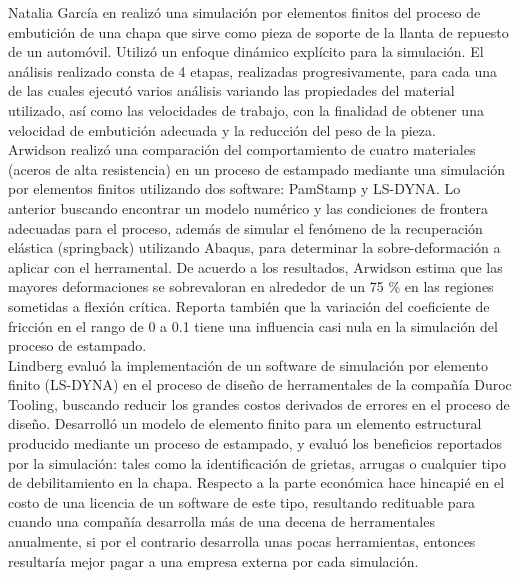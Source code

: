 Natalia García en \cite{garcia2009} realizó una simulación por elementos finitos del proceso de 
embutición de una chapa que sirve como pieza de soporte de la llanta de repuesto de un automóvil. 
Utilizó un enfoque dinámico explícito para la simulación. El análisis realizado consta 
de 4 etapas, realizadas progresivamente, para cada una de las cuales ejecutó varios análisis 
variando las propiedades del material utilizado, así como las velocidades de trabajo, con la 
finalidad de obtener una velocidad de embutición adecuada y la reducción del peso de la pieza.\\

Arwidson \cite{arwidson2005} realizó una comparación del comportamiento de cuatro materiales (aceros de
alta resistencia) en un proceso de estampado mediante una simulación por elementos finitos
utilizando dos software: PamStamp y LS-DYNA. Lo anterior buscando encontrar un modelo 
numérico y las condiciones de frontera adecuadas para el proceso, además de simular
el fenómeno de la recuperación elástica (springback) utilizando Abaqus, para determinar la
sobre-deformación a aplicar con el herramental. De acuerdo a los resultados, Arwidson estima
que las mayores deformaciones se sobrevaloran en alrededor de un 75 \% en las regiones sometidas 
a flexión crítica. Reporta también que la variación del coeficiente de fricción en el rango 
de 0 a 0.1 tiene una influencia casi nula en la simulación del proceso de estampado. \\


Lindberg \cite{lindberg2012} evaluó la implementación de un software de simulación por elemento finito 
(LS-DYNA) en el proceso de diseño de herramentales de la compañía Duroc Tooling, buscando
reducir los grandes costos derivados de errores en el proceso de diseño. Desarrolló un modelo
de elemento finito para un elemento estructural producido mediante un proceso de estampado, 
y evaluó los beneficios reportados por la simulación: tales como la identificación de grietas,
arrugas o cualquier tipo de debilitamiento en la chapa. Respecto a la parte económica hace
hincapié en el costo de una licencia de un software de este tipo, resultando redituable para 
cuando una compañía desarrolla más de una decena de herramentales anualmente, si por el
contrario desarrolla unas pocas herramientas, entonces resultaría mejor pagar a una empresa
externa por cada simulación.\\

